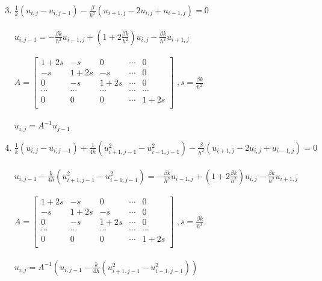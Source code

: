 \documentclass[12pt, a4paper]{report}
\begin{document}
\begin{enumerate}
 \setcounter{enumi}{2}

\item$\frac{1}{k}(u_{i,j}-u_{i,j-1})-\frac{\beta}{h^{2}}(u_{i+1,j}-2u_{i,j}+u_{i-1,j})=0$\\\\
$u_{i,j-1}=-\frac{\beta k}{h^{2}}u_{i-1,j}+(1+2\frac{\beta k}{h^{2}})u_{i,j}-\frac{\beta k}{h^{2}}u_{i+1,j}$\\\\
$A=
\begin{bmatrix}
1+2s & -s & 0 & \cdots & 0\\
-s & 1+2s & -s & \cdots & 0\\
0 & -s & 1+2s & \cdots & 0\\
\cdots & \cdots & \cdots & \cdots & \cdots\\
0 & 0 & 0 & \cdots & 1+2s\\
\end{bmatrix}$
$,s=\frac{\beta k}{h^{2}}$\\\\
$u_{i,j}=A^{-1}u_{j-1}$

\item$\frac{1}{k}(u_{i,j}-u_{i,j-1})+\frac{1}{4h}(u_{i+1,j-1}^{2}-u_{i-1,j-1}^{2})-\frac{\beta}{h^{2}}(u_{i+1,j}-2u_{i,j}+u_{i-1,j})=0$\\\\
$u_{i,j-1}-\frac{k}{4h}(u_{i+1,j-1}^{2}-u_{i-1,j-1}^{2})=-\frac{\beta k}{h^{2}}u_{i-1,j}+(1+2\frac{\beta k}{h^{2}})u_{i,j}-\frac{\beta k}{h^{2}}u_{i+1,j}$\\\\
$A=
\begin{bmatrix}
1+2s & -s & 0 & \cdots & 0\\
-s & 1+2s & -s & \cdots & 0\\
0 & -s & 1+2s & \cdots & 0\\
\cdots & \cdots & \cdots & \cdots & \cdots\\
0 & 0 & 0 & \cdots & 1+2s\\
\end{bmatrix}$
$,s=\frac{\beta k}{h^{2}}$\\\\
$u_{i,j}=A^{-1}(u_{i,j-1}-\frac{k}{4h}(u_{i+1,j-1}^{2}-u_{i-1,j-1}^{2}))$
\end{enumerate}
\end{document}
